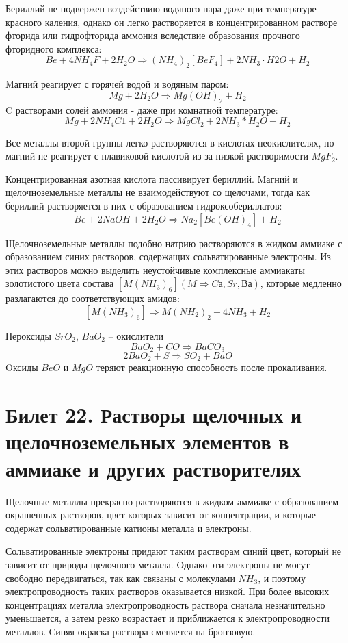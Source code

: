 \documentclass[11pt]{article}
\begin{document}
Бериллий не подвержен воздействию водяного пара даже при температуре
красного каления, однако он легко растворяется в концентрированном растворе фторида
или гидрофторида аммония вследствие образования прочного фторидного комплекса:
$$Be + 4NH_4F + 2H_2O \Rightarrow (NH_4)_2[BeF_4] + 2NH_3\cdot H2O + H_2$$

Mагний реагирует с горячей водой и водяным паром:
$$Mg + 2H_2O \Rightarrow Mg(OH)_2 + H_2$$
C растворами солей аммония - даже при комнатной температуре:
$$Mg + 2NH_4C1 + 2H_2O \Rightarrow MgCl_2 + 2NH_3 * H_2O + H_2$$

Все металлы второй группы легко растворяются в кислотах-неокислителях, но
магний не реагирует с плавиковой кислотой из-за низкой растворимости $MgF_2$.

Концентрированная азотная кислота пассивирует бериллий. Mагний и щелочноземельные
металлы не взаимодействуют со щелочами, тогда как бериллий растворяется в них с
образованием гидроксобериллатов:
$$Be + 2NaOH + 2H_2O \Rightarrow Na_2[Be(OH)_4] + H_2$$

Щелочноземельные металлы подобно натрию растворяются в жидком аммиаке с
образованием синих растворов, содержащих сольватированные электроны. Из этих
растворов можно выделить неустойчивые комплексные аммиакаты золотистого цвета
состава $[M(NH_3)_6] (M \Rightarrow Cа, Sr, Ва)$, которые медленно разлагаются до соответствующих
амидов:
$$[M(NH_3)_6] \Rightarrow M(NH_2)_2 + 4NH_3 + H_2$$

Пероксиды $SrO_2$, $BaO_2$ – окислители
$$BaO_2 + CO \Rightarrow BaCO_3$$
$$2BaO_2 + S \Rightarrow SO_2 + BaO$$
Oксиды $BeO$ и $MgO$ теряют реакционную способность после прокаливания.

\section{Билет 22. Растворы щелочных и щелочноземельных элементов в аммиаке и других растворителях}

Щелочные металлы прекрасно растворяются в жидком аммиаке с образованием окрашенных растворов,
цвет которых зависит от концентрации, и которые содержат сольватированные катионы металла и
электроны.

Сольватированные электроны придают таким растворам синий цвет, который не зависит от природы
щелочного металла. Oднако эти электроны не могут свободно передвигаться, так как связаны с молекулами
$NH_3$, и поэтому электропроводность таких растворов оказывается низкой. При более высоких
концентрациях металла электропроводность раствора сначала незначительно уменьшается, а затем резко
возрастает и приближается к электропроводности металлов. Синяя окраска раствора сменяется на
бронзовую.
\end{document}
